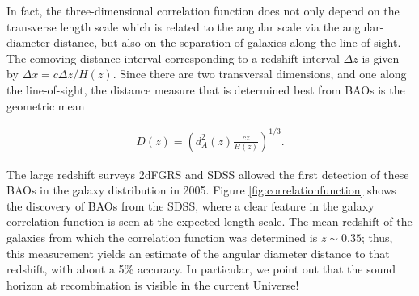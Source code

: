 \documentclass[a4paper,11pt]{article}
\begin{document}
{\noindent}In fact, the three-dimensional correlation function does not only depend on the transverse length scale which is related to the angular scale via the angular-diameter distance, but also on the separation of galaxies along the line-of-sight. The comoving distance interval corresponding to a redshift interval $\Delta z$ is given by $\Delta x=c\Delta z/H(z)$. Since there are two transversal dimensions, and one along the line-of-sight, the distance measure that is determined best from BAOs is the geometric mean

\begin{align*}
    D(z) = \left(d_A^2(z)\frac{cz}{H(z)}\right)^{1/3}.
\end{align*}

{\noindent}The large redshift surveys 2dFGRS and SDSS allowed the first detection of these BAOs in the galaxy distribution in 2005. Figure \ref{fig:correlationfunction} shows the discovery of BAOs from the SDSS, where a clear feature in the galaxy correlation function is seen at the expected length scale. The mean redshift of the galaxies from which the correlation function was determined is $z\sim0.35$; thus, this measurement yields an estimate of the angular diameter distance to that redshift, with about a 5\% accuracy. In particular, we point out that the sound horizon at recombination is visible in the current Universe!
\end{document}
